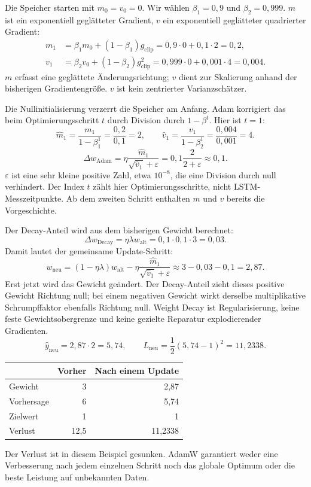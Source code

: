 Die Speicher starten mit $m_0=v_0=0$. Wir wählen $\beta_1=0{,}9$ und $\beta_2=0{,}999$. $m$ ist ein exponentiell geglätteter Gradient, $v$ ein exponentiell geglätteter quadrierter Gradient:
\[
\begin{aligned}
m_1&=\beta_1m_0+(1-\beta_1)g_{\mathrm{clip}}
=0{,}9\cdot0+0{,}1\cdot2=\boxed{0{,}2},\\
v_1&=\beta_2v_0+(1-\beta_2)g_{\mathrm{clip}}^2
=0{,}999\cdot0+0{,}001\cdot4=\boxed{0{,}004}.
\end{aligned}
\]
$m$ erfasst eine geglättete Änderungsrichtung; $v$ dient zur Skalierung anhand der bisherigen Gradientengröße. $v$ ist kein zentrierter Varianzschätzer.

Die Nullinitialisierung verzerrt die Speicher am Anfang. Adam korrigiert das beim Optimierungsschritt $t$ durch Division durch $1-\beta^t$. Hier ist $t=1$:
\[
\hat m_1=\frac{m_1}{1-\beta_1^1}=\frac{0{,}2}{0{,}1}=\boxed{2},
\qquad
\hat v_1=\frac{v_1}{1-\beta_2^1}=\frac{0{,}004}{0{,}001}=\boxed{4}.
\]
\[
\Delta w_{\mathrm{Adam}}
=\eta\frac{\hat m_1}{\sqrt{\hat v_1}+\varepsilon}
=0{,}1\frac{2}{2+\varepsilon}\approx\boxed{0{,}1}.
\]
$\varepsilon$ ist eine sehr kleine positive Zahl, etwa $10^{-8}$, die eine Division durch null verhindert. Der Index $t$ zählt hier Optimierungsschritte, nicht LSTM-Messzeitpunkte. Ab dem zweiten Schritt enthalten $m$ und $v$ bereits die Vorgeschichte.

Der Decay-Anteil wird aus dem bisherigen Gewicht berechnet:
\[
\Delta w_{\mathrm{Decay}}=\eta\lambda w_{\mathrm{alt}}
=0{,}1\cdot0{,}1\cdot3=\boxed{0{,}03}.
\]
Damit lautet der gemeinsame Update-Schritt:
\[
\boxed{
 w_{\mathrm{neu}}
 =(1-\eta\lambda)w_{\mathrm{alt}}
 -\eta\frac{\hat m_1}{\sqrt{\hat v_1}+\varepsilon}
 \approx3-0{,}03-0{,}1=2{,}87.
}
\]
Erst jetzt wird das Gewicht geändert. Der Decay-Anteil zieht dieses positive Gewicht Richtung null; bei einem negativen Gewicht wirkt derselbe multiplikative Schrumpffaktor ebenfalls Richtung null. Weight Decay ist Regularisierung, keine feste Gewichtsobergrenze und keine gezielte Reparatur explodierender Gradienten.
\clearpage
{}
\[
\hat y_{\mathrm{neu}}=2{,}87\cdot2=5{,}74,
\qquad L_{\mathrm{neu}}=\frac12(5{,}74-1)^2=\boxed{11{,}2338}.
\]
\begin{center}\begin{tabular}{lrr}\toprule & Vorher & Nach einem Update\\\midrule
Gewicht & 3 & 2,87\\
Vorhersage & 6 & 5,74\\
Zielwert & 1 & 1\\
Verlust & 12,5 & 11,2338\\\bottomrule\end{tabular}\end{center}
Der Verlust ist in diesem Beispiel gesunken. AdamW garantiert weder eine Verbesserung nach jedem einzelnen Schritt noch das globale Optimum oder die beste Leistung auf unbekannten Daten.

